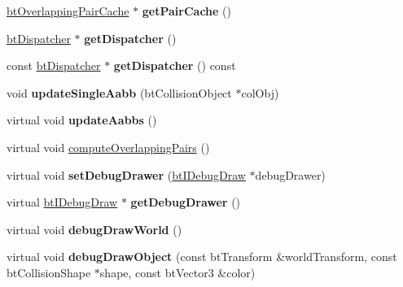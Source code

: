 \begin{DoxyCompactItemize}
\item 
\mbox{\label{classbtCollisionWorld_a7327cc034ead04b732bd242f21b690cf}} 
\hyperlink{classbtOverlappingPairCache}{bt\+Overlapping\+Pair\+Cache} $\ast$ {\bfseries get\+Pair\+Cache} ()
\item 
\mbox{\label{classbtCollisionWorld_a65b5cb3b0070b3aca14cb4c2aff25ed5}} 
\hyperlink{classbtDispatcher}{bt\+Dispatcher} $\ast$ {\bfseries get\+Dispatcher} ()
\item 
\mbox{\label{classbtCollisionWorld_a1b29bf1f9ba7b192838708a3650ea26e}} 
const \hyperlink{classbtDispatcher}{bt\+Dispatcher} $\ast$ {\bfseries get\+Dispatcher} () const
\item 
\mbox{\label{classbtCollisionWorld_a47cc9f4005a5de0c0aff85637943a495}} 
void {\bfseries update\+Single\+Aabb} (bt\+Collision\+Object $\ast$col\+Obj)
\item 
\mbox{\label{classbtCollisionWorld_a7e45d1db9c1dca744fbc939340ecc10d}} 
virtual void {\bfseries update\+Aabbs} ()
\item 
virtual void \hyperlink{classbtCollisionWorld_a91a0511ba3176f9cc1b58759262f9bd3}{compute\+Overlapping\+Pairs} ()
\item 
\mbox{\label{classbtCollisionWorld_a5a36450fa77f61d62952d3625cf54287}} 
virtual void {\bfseries set\+Debug\+Drawer} (\hyperlink{classbtIDebugDraw}{bt\+I\+Debug\+Draw} $\ast$debug\+Drawer)
\item 
\mbox{\label{classbtCollisionWorld_a68669563c969bedaab6b1a1a073b1507}} 
virtual \hyperlink{classbtIDebugDraw}{bt\+I\+Debug\+Draw} $\ast$ {\bfseries get\+Debug\+Drawer} ()
\item 
\mbox{\label{classbtCollisionWorld_a5bd13c4f8d557ed8dbe47eb575812269}} 
virtual void {\bfseries debug\+Draw\+World} ()
\item 
\mbox{\label{classbtCollisionWorld_ae23b8c3ec8f0c4b9c9338dda50f65c2d}} 
virtual void {\bfseries debug\+Draw\+Object} (const bt\+Transform \&world\+Transform, const bt\+Collision\+Shape $\ast$shape, const bt\+Vector3 \&color)

\end{DoxyCompactItemize}
